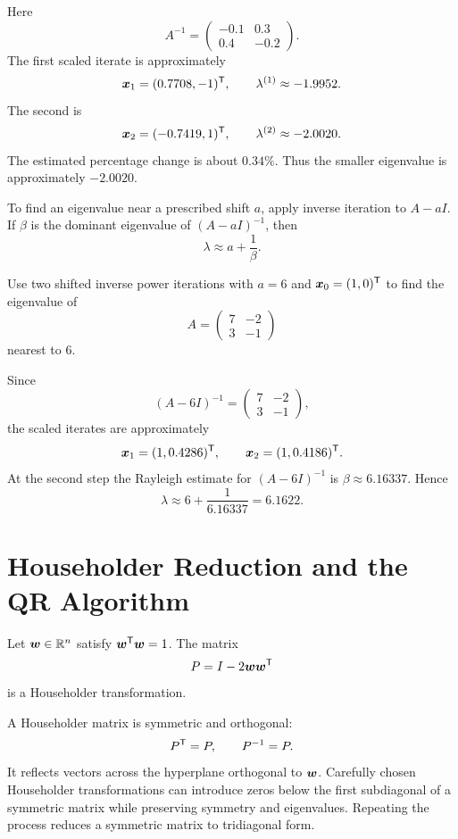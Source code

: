 \begin{solution}[5.2cm]
Here
\[
 A^{-1}=\begin{pmatrix}-0.1&0.3\\0.4&-0.2\end{pmatrix}.
\]
The first scaled iterate is approximately
\[
 \boldsymbol{x}_1=(0.7708,-1)^{\mathsf T},
 \qquad \lambda^{(1)}\approx-1.9952.
\]
The second is
\[
 \boldsymbol{x}_2=(-0.7419,1)^{\mathsf T},
 \qquad \lambda^{(2)}\approx-2.0020.
\]
The estimated percentage change is about $0.34\%$.  Thus the smaller eigenvalue is approximately $-2.0020$.
\end{solution}

To find an eigenvalue near a prescribed shift $a$, apply inverse iteration to
$A-aI$.  If $\beta$ is the dominant eigenvalue of $(A-aI)^{-1}$, then
\[
 \lambda\approx a+\frac1\beta.
\]

\begin{example}
Use two shifted inverse power iterations with $a=6$ and
$\boldsymbol{x}_0=(1,0)^{\mathsf T}$ to find the eigenvalue of
\[
 A=\begin{pmatrix}7&-2\\3&-1\end{pmatrix}
\]
nearest to $6$.
\end{example}

\begin{solution}[4.2cm]
Since
\[
 (A-6I)^{-1}=\begin{pmatrix}7&-2\\3&-1\end{pmatrix},
\]
the scaled iterates are approximately
\[
 \boldsymbol{x}_1=(1,0.4286)^{\mathsf T},
 \qquad
 \boldsymbol{x}_2=(1,0.4186)^{\mathsf T}.
\]
At the second step the Rayleigh estimate for $(A-6I)^{-1}$ is
$\beta\approx6.16337$.  Hence
\[
 \lambda\approx6+\frac1{6.16337}=6.1622.
\]
\end{solution}

\section{Householder Reduction and the QR Algorithm}

\begin{definition}
Let $\boldsymbol{w}\in\mathbb{R}^n$ satisfy $\boldsymbol{w}^{\mathsf T}\boldsymbol{w}=1$.  The matrix
\[
 P=I-2\boldsymbol{w}\boldsymbol{w}^{\mathsf T}
\]
is a Householder transformation.
\end{definition}

A Householder matrix is symmetric and orthogonal:
\[
 P^{\mathsf T}=P,
 \qquad
 P^{-1}=P.
\]
It reflects vectors across the hyperplane orthogonal to $\boldsymbol{w}$.  Carefully chosen Householder transformations can introduce zeros below the first subdiagonal of a symmetric matrix while preserving symmetry and eigenvalues.  Repeating the process reduces a symmetric matrix to tridiagonal form.

